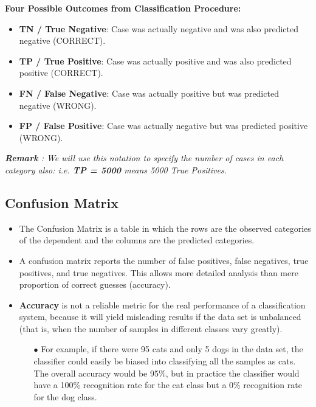 \documentclass[]{report}
\begin{document}
\begin{framed}
	\textbf{Four Possible Outcomes from Classification Procedure:}\\ 
	\begin{itemize}
		\item \textbf{TN / True Negative}: Case was actually negative and was also predicted negative (CORRECT).
		\item \textbf{TP / True Positive}: Case was actually positive and was also predicted positive (CORRECT).
		\item \textbf{FN / False Negative}: Case was actually positive but was predicted negative (WRONG).
		\item \textbf{FP / False Positive}: Case was actually negative but was predicted positive (WRONG).
	\end{itemize}
\end{framed}
\noindent \textit{\textbf{Remark} : We will use this notation to specify the number of cases in each category also: i.e. \textbf{TP = 5000} means 5000 True Positives.}
\subsection*{Confusion Matrix}
\begin{itemize}
	\item The Confusion Matrix is a table in which the rows are the observed categories of
	the dependent and the columns are the predicted categories. 
	\item A confusion matrix reports
	the number of false positives, false negatives, true positives, and true
	negatives. This allows more detailed analysis than mere proportion of correct guesses
	(accuracy). 
	\item \textbf{Accuracy} is not a reliable metric for the real performance of a
	classification system, because it will yield misleading results if the data set is unbalanced
	(that is, when the number of samples in different classes vary greatly).
	\begin{itemize}
		\item[$\bullet$] For example, if there were 95 cats and only 5 dogs in the data set, the
		classifier could easily be biased into classifying all the samples as cats. The
		overall accuracy would be 95\%, but in practice the classifier would have a
		100\% recognition rate for the cat class but a 0\% recognition rate for the dog
		class.
	\end{itemize}
\end{itemize}
\end{document}
